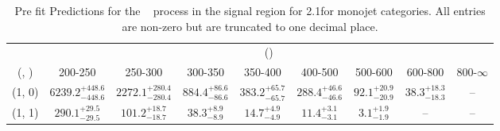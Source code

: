 \begin{table}[h!]
\tiny
\centering
\caption{Pre fit Predictions for the \zInv~ process in the signal region for 2.1\ifb for monojet categories. All entries are non-zero but are truncated to one decimal place.\label{tab:predsep_sig_zinv_mono}}
\begin{tabular}
{ccccccccc}
	\hline\hline
	& \multicolumn{8}{c}{\scalht (\gev)} \\ 
	 (\njet,  \nb) & 200-250 & 250-300 & 300-350 & 350-400 & 400-500 & 500-600 & 600-800 & 800-$\infty$ \\ [0.8ex] 
\hline
	(1, 0) & $6239.2^{+ 448.6 }_{- 448.6 }$ & $2272.1^{+ 280.4 }_{- 280.4 }$ & $884.4^{+ 86.6 }_{- 86.6 }$ & $383.2^{+ 65.7 }_{- 65.7 }$ & $288.4^{+ 46.6 }_{- 46.6 }$ & $92.1^{+ 20.9 }_{- 20.9 }$ & $38.3^{+ 18.3 }_{- 18.3 }$ & -- \\[0.5ex] 
	(1, 1) & $290.1^{+ 29.5 }_{- 29.5 }$ & $101.2^{+ 18.7 }_{- 18.7 }$ & $38.3^{+ 8.9 }_{- 8.9 }$ & $14.7^{+ 4.9 }_{- 4.9 }$ & $11.4^{+ 3.1 }_{- 3.1 }$ & $3.1^{+ 1.9 }_{- 1.9 }$ & -- & -- \\[0.5ex] 
	\hline
	\hline
\end{tabular}
\end{table}
